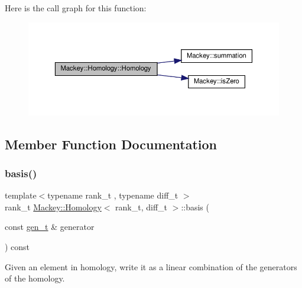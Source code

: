 Here is the call graph for this function\+:\nopagebreak
\begin{figure}[H]
\begin{center}
\leavevmode
\includegraphics[width=350pt]{classMackey_1_1Homology_af42f480509ef68df47308c0f506d44c8_cgraph}
\end{center}
\end{figure}


\subsection{Member Function Documentation}
\mbox{\label{classMackey_1_1Homology_a2e6fb6da3abdba934a1eb2f4236623cb}} 
\subsubsection{\texorpdfstring{basis()}{basis()}}
{\footnotesize\ttfamily template$<$typename rank\+\_\+t , typename diff\+\_\+t $>$ \\
rank\+\_\+t \hyperlink{classMackey_1_1Homology}{Mackey\+::\+Homology}$<$ rank\+\_\+t, diff\+\_\+t $>$\+::basis (\begin{DoxyParamCaption}\item[{const \hyperlink{classMackey_1_1Homology_a0f7541ee6181c75cb7efa41f3b63f0a5}{gen\+\_\+t} \&}]{generator }\end{DoxyParamCaption}) const}



Given an element in homology, write it as a linear combination of the generators of the homology. 

